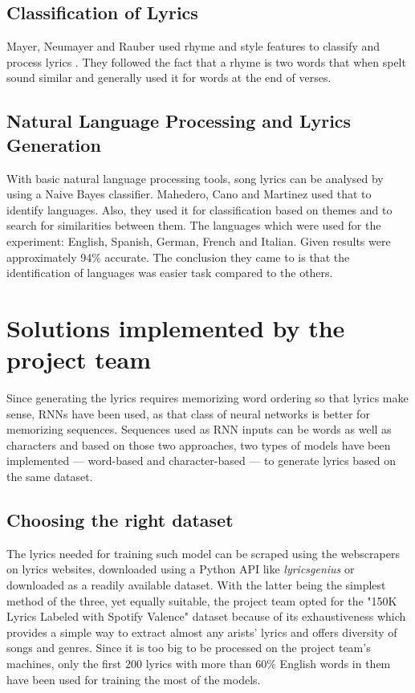 \documentclass[conference]{IEEEtran}
\begin{document}
\subsection{Classification of Lyrics}
Mayer, Neumayer and Rauber used rhyme and style features to classify and process lyrics \cite{b6}. 
They followed the fact that a rhyme is two words that when spelt sound similar and generally used it for words at the end of verses.

\subsection{Natural Language Processing and Lyrics Generation}
With basic natural language processing tools, song lyrics can be analysed by using a Naive Bayes classifier. Mahedero, Cano and Martinez used that to 
identify languages. Also, they used it for classification based on themes and to search for similarities between them. 
The languages which were used for the experiment: English, Spanish, German, French and Italian. Given results were approximately 94\% accurate.
The conclusion they came to is that the identification of languages was easier task compared to the others.

\section{Solutions implemented by the project team} %
Since generating the lyrics requires memorizing word ordering so that lyrics
make sense, RNNs have been used, as that class of neural networks is better for
memorizing sequences. Sequences used as RNN inputs can be words as well as
characters and based on those two approaches, two types of models have been
implemented --- word-based and character-based --- to generate lyrics based on
the same dataset.

\subsection{Choosing the right dataset}
The lyrics needed for training such model can be scraped using the webscrapers on
lyrics websites, downloaded using a Python API like \textit{lyricsgenius} or
downloaded as a readily available dataset. With the latter being the simplest
method of the three, yet equally suitable, the project team opted for the
"150K Lyrics Labeled with Spotify Valence" dataset because of its exhaustiveness
which provides a simple way to extract almost any arists' lyrics and  offers
diversity of songs and genres. Since it is too big to be processed on the
project team's machines, only the first 200 lyrics with more than 60\% English
words in them have been used for training the most of the models.
\end{document}
